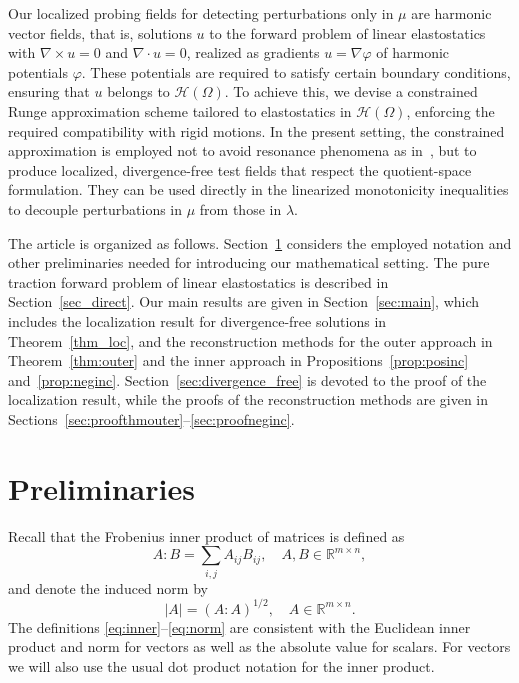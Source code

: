\documentclass[reqno]{amsart}
\numberwithin{equation}{section}
\numberwithin{figure}{section}
\numberwithin{table}{section}
\newcommand{\abs}[1]{\lvert#1\rvert}
\newcommand{\R}{\mathbb{R}}
\theoremstyle{definition}
\theoremstyle{plain}
\theoremstyle{definition}
\theoremstyle{remark}
\numberwithin{equation}{section}
\begin{document}
Our localized probing fields for detecting perturbations only in $\mu$ are harmonic vector fields, that is, solutions $u$ to the forward problem of linear elastostatics with $\nabla \times u = 0$ and $\nabla \cdot u = 0$, realized as gradients $u = \nabla \varphi$ of harmonic potentials $\varphi$. These potentials are required to satisfy certain boundary conditions, ensuring that $u$ belongs to $\mathcal{H}(\Omega)$. To achieve this, we devise a constrained Runge approximation scheme tailored to elastostatics in $\mathcal{H}(\Omega)$, enforcing the required compatibility with rigid motions. In the present setting, the constrained approximation is employed not to avoid resonance phenomena as in~\cite{EP23,EP26,HPS19b}, but to produce localized, divergence-free test fields that respect the quotient-space formulation. They can be used directly in the linearized monotonicity inequalities to decouple perturbations in $\mu$ from those in $\lambda$.

The article is organized as follows. Section~\ref{sec:preliminaries} considers the employed notation and other preliminaries needed for introducing our mathematical setting. The pure traction forward problem of linear elastostatics is described in Section~\ref{sec_direct}. Our main results are given in Section~\ref{sec:main}, which includes the localization result for divergence-free solutions in Theorem~\ref{thm_loc}, and the reconstruction methods for the outer approach in Theorem~\ref{thm:outer} and the inner approach in Propositions~\ref{prop:posinc} and~\ref{prop:neginc}. Section~\ref{sec:divergence_free} is devoted to the proof of the localization result, while the proofs of the reconstruction methods are given in Sections~\ref{sec:proofthmouter}--\ref{sec:proofneginc}.  

\section{Preliminaries}
\label{sec:preliminaries}

Recall that the Frobenius inner product of matrices is defined as
%
\begin{equation} \label{eq:inner}
	A:B = \sum_{i,j} A_{ij}B_{ij}, \quad A,B \in \R^{m\times n},
\end{equation}
%
and denote the induced norm by
%
\begin{equation} \label{eq:norm}
	\abs{A} = (A:A)^{1/2}, \quad A \in \R^{m \times n}.
\end{equation}
%
The definitions \eqref{eq:inner}--\eqref{eq:norm} are consistent with the Euclidean inner product and norm for vectors as well as the absolute value for scalars. For vectors we will also use the usual dot product notation for the inner product.
\end{document}
